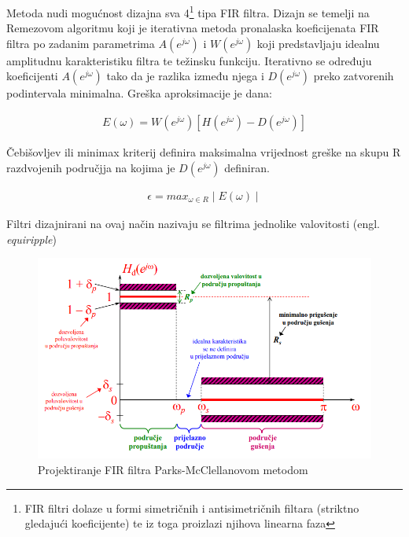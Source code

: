 \documentclass[times, utf8, diplomski]{fer}
\begin{document}
Metoda nudi mogućnost dizajna sva 4\footnote{FIR filtri dolaze u formi simetričnih i antisimetričnih filtara (striktno gledajući koeficijente) te iz toga proizlazi njihova linearna faza} tipa FIR filtra. Dizajn se temelji na Remezovom algoritmu koji je iterativna metoda pronalaska koeficijenata FIR filtra po zadanim parametrima $A(e^{j\omega})$ i $W(e^{j\omega})$ koji predstavljaju idealnu amplitudnu karakteristiku filtra te težinsku funkciju. Iterativno se određuju koeficijenti $A(e^{j\omega})$ tako da je razlika između njega i $D(e^{j\omega})$ preko zatvorenih podintervala minimalna. Greška aproksimacije je dana:

\begin{equation}
\begin{aligned}
E(\omega) = W(e^{j\omega})[H(e^{j\omega})-D(e^{j\omega})]
\end{aligned}
\end{equation}

Čebišovljev ili minimax kriterij definira maksimalna vrijednost greške na skupu R razdvojenih područjja na kojima je $D(e^{j\omega})$ definiran.

\begin{equation}
\begin{aligned}
\epsilon = max_{\omega \in R}\mid E(\omega) \mid
\end{aligned}
\end{equation}

Filtri dizajnirani na ovaj način nazivaju se filtrima jednolike valovitosti (engl. \textit{equiripple})

\begin{figure}[hbt!]
 \centering
 \includegraphics[scale=0.6]{photos/firpm.png}
 \caption{Projektiranje FIR filtra Parks-McClellanovom metodom}
 \label{firpm}
\end{figure}
\end{document}
